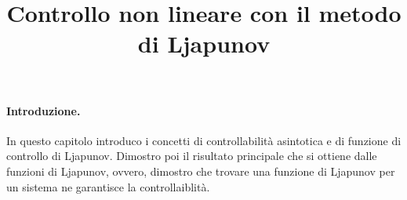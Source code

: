 \title{Controllo non lineare con il metodo di Ljapunov}

\maketitle
\label{sec:nonlinear-control}


\paragraph{Introduzione.}

In questo capitolo introduco i concetti di
controllabilità asintotica e di funzione di controllo di
Ljapunov. Dimostro poi il risultato principale
che si ottiene dalle funzioni di Ljapunov, ovvero,
dimostro che trovare una funzione di Ljapunov per un sistema
ne garantisce la controllaiblità.



